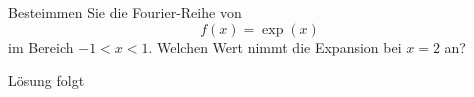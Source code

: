 \documentclass{atistandalonetask}
\begin{document}
  \begin{atiTask}[
    title = \textsc{Fourier}-Reihe I
  ]
  
 Besteimmen Sie die Fourier-Reihe von
 \[
 f(x)=\exp(x)
 \]
 im Bereich $-1<x<1$. Welchen Wert nimmt die Expansion bei $x=2$ an?
  \end{atiTask}
  \begin{atiSolution}
   	Lösung folgt
  \end{atiSolution}
\end{document}
